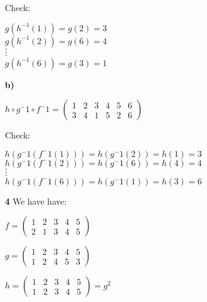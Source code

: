 \documentclass{article}
\begin{document}
\medskip

	Check: \begin{center}
				$g(h^{-1}(1))=g(2)=3 $ \\
				
				$g(h^{-1}(2))=g(6)=4 $ \\
									          $\cdot$ \\
									          $\cdot$ \\
									          $\cdot $\\
				$g(h^{-1}(6))=g(3)=1 $					
				
				\end{center}
\medskip

\hspace{.2in}\textbf{b)}

$h \circ g^-1 \circ f^-1=(\begin{smallmatrix}
1 & 2 & 3 & 4 & 5 & 6 \\	
3 & 4 & 1 & 5 & 2 & 6
\end{smallmatrix})$

\medskip

Check: \begin{center}
				$h(g^-1(f^-1(1)))=h(g^-1(2)) =h(1)=3 $ \\
				
				$h(g^-1(f^-1(2)))=h(g^-1(6))=h(4)=4 $ \\
									          $\cdot$ \\
									          $\cdot$ \\
									          $\cdot $\\
				$h(g^-1(f^-1(6)))=h(g^-1(1))=h(3)=6 $					
				
				\end{center}
\newpage


\textbf{4} We have have:

\medskip

$f=(\begin{smallmatrix}
1 & 2 & 3 & 4 & 5 \\
2 & 1 & 3 & 4 & 5
\end{smallmatrix})$

\medskip

$g=(\begin{smallmatrix}
1 & 2 & 3 & 4 & 5 \\
1 & 2 & 4 & 5 & 3
\end{smallmatrix})$

\medskip

$h=(\begin{smallmatrix}
1 & 2 & 3 & 4 & 5 \\
1 & 2 & 3 & 4 & 5
\end{smallmatrix})=g^{2}$
\end{document}
